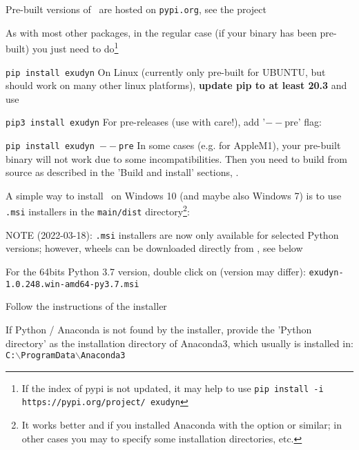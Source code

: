 Pre-built versions of \codeName\ are hosted on \texttt{pypi.org}, see the project
\bi
 \item {}
\ei
As with most other packages, in the regular case (if your binary has been pre-built) you just need to do\footnote{If the index of pypi is not updated, it may help to use \texttt{pip install -i https://pypi.org/project/ exudyn} }
\bi
  \item[] \texttt{pip install exudyn}
\ei
On Linux (currently only pre-built for UBUNTU, but should work on many other linux platforms), {\bf update pip to at least 20.3} and use 
\bi
  \item[] \texttt{pip3 install exudyn}
\ei
For pre-releases (use with care!), add '$--$pre' flag:
\bi
  \item[] \texttt{pip install exudyn $--$pre}
\ei
In some cases (e.g. for AppleM1), your pre-built binary will not work due to some incompatibilities. Then you need to build from source as described in the 'Build and install' sections, .

A simple way to install \codeName\ on Windows 10 (and maybe also Windows 7) is to use \texttt{.msi} installers in the \texttt{main/dist} directory\footnote{It works better  and if you installed Anaconda with the option  or similar; in other cases you may to specify some installation directories, etc.}:
\bi
  \item NOTE (2022-03-18): \texttt{.msi} installers are now only available for selected Python versions; however, wheels can be downloaded directly from , see below
  \item For the 64bits Python 3.7 version, double click on (version may differ):\ignoreRST{\\} \texttt{exudyn-1.0.248.win-amd64-py3.7.msi}
  \item Follow the instructions of the installer
  \item If Python / Anaconda is not found by the installer, provide the 'Python directory' as the installation directory of Anaconda3, which usually is installed in:\\
  \texttt{C:$\backslash$ProgramData$\backslash$Anaconda3}
\ei

